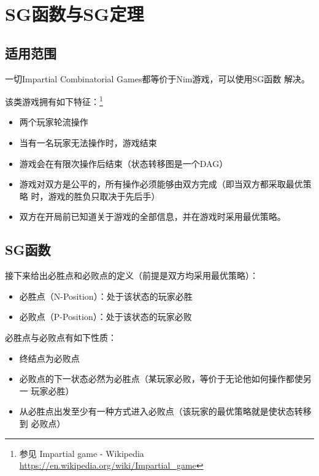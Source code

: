 \section{SG函数与SG定理}

\subsection{适用范围}

一切Impartial Combinatorial Games都等价于Nim游戏，可以使用SG函数
解决。

该类游戏拥有如下特征：\footnote{参见 Impartial game - Wikipedia
	\url{https://en.wikipedia.org/wiki/Impartial_game}}

\begin{itemize}

	\item 两个玩家轮流操作
	\item 当有一名玩家无法操作时，游戏结束
	\item 游戏会在有限次操作后结束（状态转移图是一个DAG）
	\item 游戏对双方是公平的，所有操作必须能够由双方完成（即当双方都采取最优策略
	      时，游戏的胜负只取决于先后手）
	\item 双方在开局前已知道关于游戏的全部信息，并在游戏时采用最优策略。

\end{itemize}

\subsection{SG函数}

接下来给出必胜点和必败点的定义（前提是双方均采用最优策略）：

\begin{itemize}
	\item 必胜点（N-Position）：处于该状态的玩家必胜
	\item 必败点（P-Position）：处于该状态的玩家必败
\end{itemize}

必胜点与必败点有如下性质：

\begin{itemize}
	\item \begin{character}
		      终结点为必败点
	      \end{character}
	\item \begin{character}
		      必败点的下一状态必然为必胜点（某玩家必败，等价于无论他如何操作都使另一
		      玩家必胜）
	      \end{character}
	\item \begin{character}
		      从必胜点出发至少有一种方式进入必败点（该玩家的最优策略就是使状态转移到
		      必败点）
	      \end{character}
\end{itemize}

